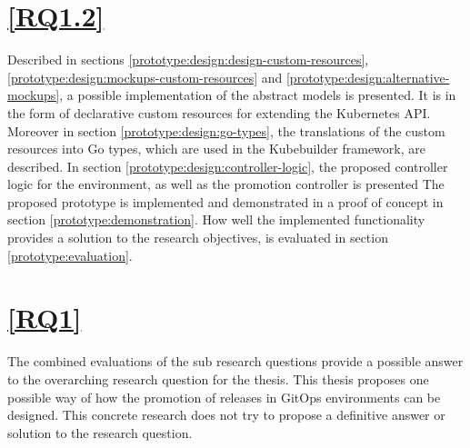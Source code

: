 \section*{\ref{RQ1.2}}

Described in sections \ref{prototype:design:design-custom-resources}, \ref{prototype:design:mockups-custom-resources} and \ref{prototype:design:alternative-mockups},
a possible implementation of the abstract models is presented.
It is in the form of declarative custom resources for extending the Kubernetes API.
%
Moreover in section \ref{prototype:design:go-types},
the translations of the custom resources into Go types, which are used in the Kubebuilder framework,
are described.
In section \ref{prototype:design:controller-logic},
the proposed controller logic for the environment, as well as the promotion controller is presented
%
The proposed prototype is implemented and demonstrated in a proof of concept in section
\ref{prototype:demonstration}.
How well the implemented functionality provides a solution to the research objectives,
is evaluated in section \ref{prototype:evaluation}.

\section*{\ref{RQ1}}

The combined evaluations of the sub research questions provide a possible answer to the
overarching research question for the thesis.
%
This thesis proposes one possible way of how
the promotion of releases in GitOps environments can be designed.
This concrete research does not try to
propose a definitive answer or solution to the research question.





































